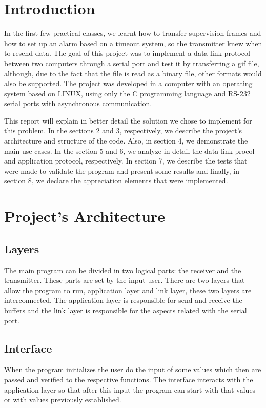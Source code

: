\documentclass[a4paper]{article}
\begin{document}
\section{Introduction}

In the first few practical classes, we learnt how to transfer supervision frames and how to set up an alarm based on a timeout system, so the transmitter knew when to resend data. The goal of this project was to implement a data link protocol between two computers through a serial port and test it by transferring a gif file, although, due to the fact that the file is read as a binary file, other formats would also be supported. The project was developed in a computer with an operating system based on LINUX, using only the C programming language and RS-232 serial ports with asynchronous communication.

This report will explain in better detail the solution we chose to implement for this problem. In the sections 2 and 3, respectively, we describe the project's architecture and structure of the code. Also, in section 4, we demonstrate the main use cases. In the section 5 and 6, we analyze in detail the data link procol and application protocol, respectively. In section 7, we describe the tests that were made to validate the program and present some results and finally, in section 8, we declare the appreciation elements that were implemented.

\section{Project's Architecture}

\subsection{Layers}
The main program can be divided in two logical parts: the receiver and the transmitter. These parts are set by the input user. There are two layers that allow the program to run, application layer and link layer, these two layers are interconnected. The application layer is responsible for send and receive the buffers and the link layer is responsible for the aspects related with the serial port.

\subsection{Interface}
When the program initializes the user do the input of some values which then are passed and verified to the respective functions. The interface interacts with the application layer so that after this input the program can start with that values or with values previously established.
\end{document}
